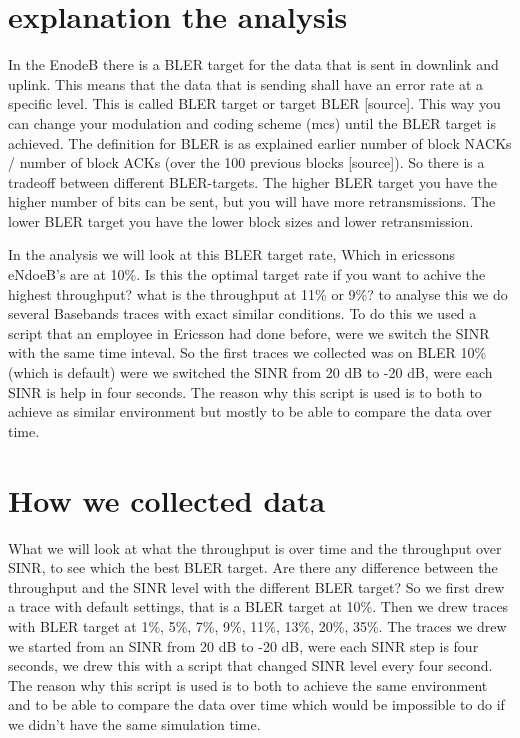 \documentclass[cropmarks, frame, english]{idamasterthesis}
\begin{document}
\section{explanation the analysis}
In the EnodeB there is a BLER target for the data that is sent in downlink and uplink. This means that the data that is sending shall have an error rate at a specific level. This is called BLER target or target BLER [source]. This way you can change your modulation and coding scheme (mcs) until the BLER target is achieved. The definition for BLER is as explained earlier number of block NACKs / number of block ACKs (over the 100 previous blocks [source]). So there is a tradeoff between different BLER-targets. The higher BLER target you have the higher number of bits can be sent, but you will have more retransmissions. The lower BLER target you have the lower block sizes and lower retransmission.

In the analysis we will look at this BLER target rate, Which in ericssons eNdoeB's are at 10\%. Is this the optimal target rate if you want to achive the highest throughput? what is the throughput at 11\% or 9\%? to analyse this we do several Basebands traces with exact similar conditions. To do this we used a script that an employee in Ericsson had done before, were we switch the SINR with the same time inteval. So the first traces we collected was on BLER 10\% (which is default) were we switched the SINR from 20 dB to -20 dB, were each SINR is help in four
seconds. The reason why this script is used is to both to achieve as similar environment but mostly to be able to compare the data over time.

\section{How we collected data}
What we will look at what the throughput is over time and the throughput over SINR, to see which the best BLER target. Are there any difference between the throughput and the SINR level with the different BLER target? So we first drew a trace with default settings, that is a BLER target at 10\%. Then we drew traces with BLER target at 1\%, 5\%, 7\%, 9\%, 11\%, 13\%, 20\%, 35\%. The traces we drew we started from an SINR from 20 dB to -20 dB, were each SINR step is four seconds, we drew this with a script that changed SINR level every four second. The reason why this script is used is to both to achieve the same environment and to be able to compare the data over time which would be impossible to do if we didn't have the same simulation time.
\end{document}
